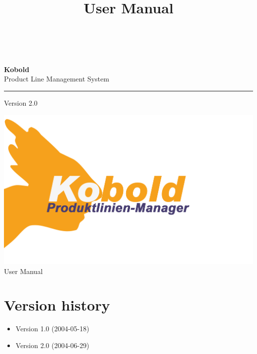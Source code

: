 \documentclass[a4paper,titlepage,12pt]{scrbook}
\title {\huge \product\\[0.5cm]\large User Manual \\[0.5cm] \version
  \\[1cm] \Large \company}
\newcommand\version{Version 2.0\xspace}
\begin{document}

\begin{titlepage}
\renewcommand{\thefootnote}{\fnsymbol{footnote}}
{\Huge
\raggedright
\textbf{\bf Kobold} \\
\huge Product Line Management System
\rule{\textwidth}{0.75pt}
\par
}
\begin{flushleft}
\normalsize
\version
\end{flushleft}


\vfill
\includegraphics[width=15cm]{../common/logo-color.png}
\vfill
{\parindent=0cm
\Huge User Manual
}


\setcounter{footnote}{0}
\end{titlepage}


\section*{Version history}

\begin{itemize}

\item Version 1.0 (2004-05-18)
\item Version 2.0 (2004-06-29)

\end{itemize}

\tableofcontents










\end{document}
